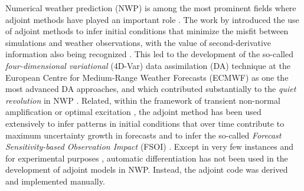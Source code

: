Numerical weather prediction (NWP) is among the most prominent fields where adjoint methods have played an important role \cite{Errico_1997}. 
The work by \cite{Talagrand.1987,Courtier.1987} introduced the use of adjoint methods to infer initial conditions that minimize the misfit between simulations and weather observations, with the value of second-derivative information also being recognized \cite{Dimet.2002}. 
This led to the development of the so-called \textit{four-dimensional variational} (4D-Var) data assimilation (DA) technique \cite{Rabier.1992,Rabier:2000uu} at the European Centre for Medium-Range Weather Forecasts (ECMWF) as one the most advanced DA approaches, and which contributed substantially to the \textit{quiet revolution} in NWP \cite{Bauer.2015}.
Related, within the framework of transient non-normal amplification or optimal excitation \cite{Farrell.1988,Farrell:1996jx}, the adjoint method has been used extensively to infer patterns in initial conditions that over time contribute to maximum uncertainty growth in forecasts \cite{Palmer:1994br,Buizza:1995in} 
and to infer the so-called \textit{Forecast Sensitivity-based Observation Impact} (FSOI) \cite{Langland:2004jo}.
Except in very few instances and for experimental purposes \cite{Giering.2006}, automatic differentiation has not been used in the development of adjoint models in NWP.
Instead, the adjoint code was derived and implemented manually.

